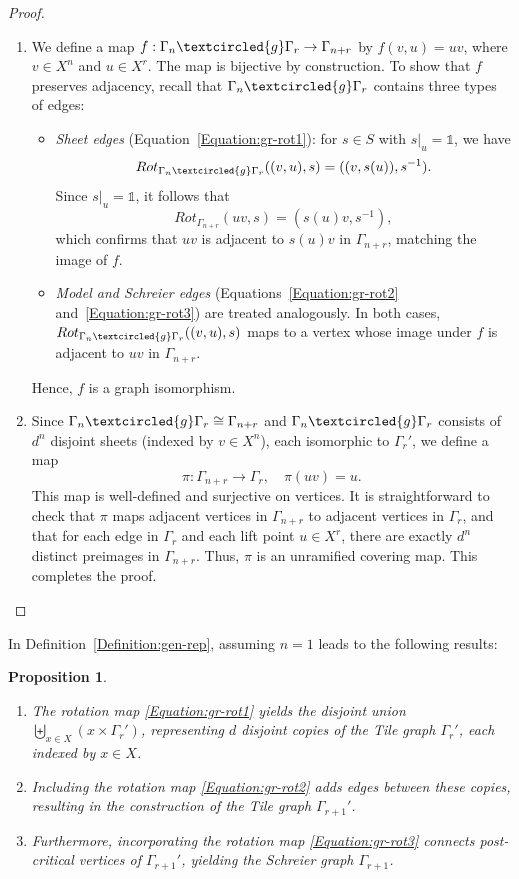 \documentclass{article}
\newtheorem{mypro}{Proposition}[section]
\newcommand{\G}{\Gamma}
\newcommand{\id}{\mathds{1}}
\newcommand{\g}{\textcircled{g}}
\begin{document}
\begin{proof}
\begin{enumerate}
    \item We define a map $f : \G_n \g \G_r \to \G_{n+r}$ by $f(v, u) = uv$, where $v \in X^n$ and $u \in X^r$. The map is bijective by construction. To show that $f$ preserves adjacency, recall that $\G_n \g \G_r$ contains three types of edges:
    \begin{itemize}
        \item \emph{Sheet edges} (Equation~\eqref{Equation:gr-rot1}): for $s \in S$ with $s|_u = \id$, we have
       $$ Rot_{\G_n \g \G_r}((v, u), s) = ((v, s(u)), s^{-1}).$$
        Since $s|_u = \id$, it follows that $$Rot_{\G_{n+r}}(uv, s) = (s(u)v, s^{-1}),$$ 
        which confirms that $uv$ is adjacent to $s(u)v$ in $\G_{n+r}$, matching the image of $f$.
        \item \emph{Model and Schreier edges} (Equations~\eqref{Equation:gr-rot2} and~\eqref{Equation:gr-rot3}) are treated analogously. In both cases, $Rot_{\G_n \g \G_r}((v, u), s)$ maps to a vertex whose image under $f$ is adjacent to $uv$ in $\G_{n+r}$.
    \end{itemize}
    Hence, $f$ is a graph isomorphism.
    \item Since $\G_n \g \G_r \cong \G_{n+r}$ and $\G_n \g \G_r$ consists of $d^n$ disjoint sheets (indexed by $v \in X^n$), each isomorphic to $\G_r'$, we define a map
    $$ \pi : \G_{n+r} \to \G_r, \quad \pi(uv) = u.$$
    This map is well-defined and surjective on vertices. It is straightforward to check that $\pi$ maps adjacent vertices in $\G_{n+r}$ to adjacent vertices in $\G_r$, and that for each edge in $\G_r$ and each lift point $u \in X^r$, there are exactly $d^n$ distinct preimages in $\G_{n+r}$. Thus, $\pi$ is an unramified covering map. This completes the proof.
\end{enumerate}
\end{proof}	

In Definition~\ref{Definition:gen-rep}, assuming $n = 1$ leads to the following results:

\begin{mypro} \begin{enumerate}
    \item \label{Proposition:r1} The rotation map \eqref{Equation:gr-rot1} yields the disjoint union \\$\displaystyle \biguplus_{x \in X} (x \times \G_r')$, representing $d$ disjoint copies of the Tile graph $\G_r'$, each indexed by $x \in X$.
    
    \item \label{Proposition:r12} Including the rotation map \eqref{Equation:gr-rot2} adds edges between these copies, resulting in the construction of the Tile graph $\G_{r+1}'$.
    
    \item \label{corollary:r123} Furthermore, incorporating the rotation map \eqref{Equation:gr-rot3} connects post-critical vertices of $\G_{r+1}'$, yielding the Schreier graph $\G_{r+1}$.
\end{enumerate} \end{mypro}
\end{document}
